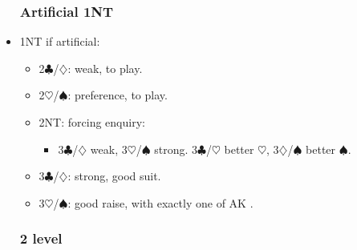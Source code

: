 \documentclass[a4paper,14pt]{extarticle}
\begin{document}
\begin{itemize}
\newpage

\subsubsection{Artificial 1NT}
\label{sec:resp:1nart}

\item 1NT if artificial:
	\begin{itemize}
   \item 2$\clubsuit$/$\diamondsuit$: weak, to play.
   \item 2$\heartsuit$/$\spadesuit$: preference, to play.
   \item 2NT: forcing enquiry:
		\begin{itemize}
      \item 3$\clubsuit$/$\diamondsuit$ weak, 3$\heartsuit$/$\spadesuit$ strong. 3$\clubsuit$/$\heartsuit$ better $\heartsuit$, 3$\diamondsuit$/$\spadesuit$ better $\spadesuit$.
		\end{itemize}
   \item 3$\clubsuit$/$\diamondsuit$: strong, good suit.
   \item 3$\heartsuit$/$\spadesuit$: good raise, with exactly one of AK .
	\end{itemize}

\newpage

\subsubsection{2 level}
\label{sec:resp:2level}


\end{itemize}
\end{document}

